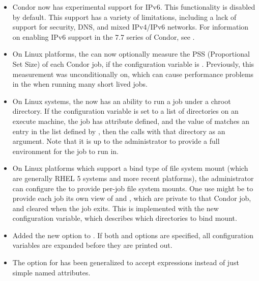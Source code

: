 \begin{itemize}

\item Condor now has experimental support for IPv6.  
This functionality is disabled by default.  
This support has a variety of limitations, 
including a lack of support for security, DNS, and mixed IPv4/IPv6 networks.  
For information on enabling IPv6 support in the 7.7 series of Condor, 
see .

\item On Linux platforms, the  can now optionally measure the
PSS (Proportional Set Size) of each Condor job,
if the configuration variable  is .
Previously, this measurement was unconditionally on,
which can cause performance problems in the  when running
many short lived jobs.

\item On Linux systems, the  now has an ability to run a 
job under a chroot directory.  
If the configuration variable  is set to a list
of directories on an execute machine, 
the job has attribute  defined,
and the value of  matches an entry 
in the list defined by ,
then the  calls  with that directory 
as an argument.  
Note that it is up to the administrator to provide a full environment 
for the job to run in.

\item On Linux platforms which support a bind type of file system mount 
(which are generally RHEL 5 systems and more recent platforms), 
the administrator can configure the  
to provide per-job file system mounts.  
One use might be to provide each job its own view of  
and , which are private to that Condor job,
and cleared when the job exits.  
This is implemented with the new  
configuration variable, which describes which directories to bind mount.

\item Added the new  option to .
If both  and  options are specified,
all configuration variables are expanded before they are printed out.

\item The  option for  has been generalized to
accept expressions instead of just simple named attributes.


\end{itemize}
